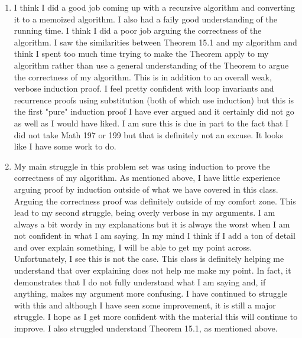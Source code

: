\documentclass[11pt]{article}
\theoremstyle{nonumberplain}
\begin{document}
\begin{enumerate}
\item I think I did a good job coming up with a recursive algorithm and converting it to a memoized algorithm. I also had a faily good understanding of the running time. I think I did a poor job arguing the correctness of the algorithm. I saw the similarities between Theorem 15.1 and my algorithm and think I spent too much time trying to make the Theorem apply to my algorithm rather than use a general understanding of the Theorem to argue the correctness of my algorithm. This is in addition to an overall weak, verbose induction proof. I feel pretty confident with loop invariants and recurrence proofs using substitution (both of which use induction) but this is the first "pure" induction proof I have ever argued and it certainly did not go as well as I would have liked. I am sure this is due in part to the fact that I did not take Math 197 or 199 but that is definitely not an excuse. It looks like I have some work to do.
\item My main struggle in this problem set was using induction to prove the correctness of my algorithm. As mentioned above, I have little experience arguing proof by induction outside of what we have covered in this class. Arguing the correctness proof was definitely outside of my comfort zone. This lead to my second struggle, being overly verbose in my arguments. I am always a bit wordy in my explanations but it is always the worst when I am not confident in what I am saying. In my mind I think if I add a ton of detail and over explain something, I will be able to get my point across. Unfortunately, I see this is not the case. This class is definitely helping me understand that over explaining does not help me make my point. In fact, it demonstrates that I do not fully understand what I am saying and, if anything, makes my argument more confusing. I have continued to struggle with this and although I have seen some improvement, it is still a major struggle. I hope as I get more confident with the material this will continue to improve. I also struggled understand Theorem 15.1, as mentioned above.   

\end{enumerate}
\end{document}
